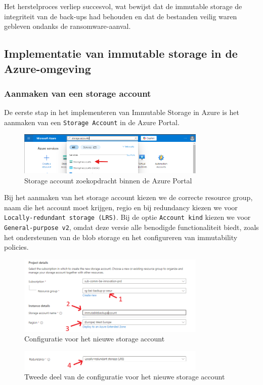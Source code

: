 Het herstelproces verliep succesvol, wat bewijst dat de immutable storage de integriteit van de back-ups had behouden en dat de bestanden veilig waren gebleven ondanks de ransomware-aanval.

\newpage
\subsection{Implementatie van immutable storage in de Azure-omgeving}
\subsubsection{Aanmaken van een storage account}
De eerste stap in het implementeren van Immutable Storage in Azure is het aanmaken van een \texttt{Storage Account} in de Azure Portal. 
\begin{figure}[h]
    \centering
    \captionsetup{justification=centering}    
    \includegraphics[width=0.8\textwidth]{img/1imm.png}
    \caption{Storage account zoekopdracht binnen de Azure Portal}
\end{figure}
Bij het aanmaken van het storage account kiezen we de correcte resource group, naam die het account moet krijgen, regio en bij redundancy kiezen we voor \texttt{Locally-redundant storage (LRS)}. Bij de optie \texttt{Account kind} kiezen we voor \texttt{General-purpose v2}, omdat deze versie alle benodigde functionaliteit biedt, zoals het ondersteunen van de blob storage en het configureren van immutability policies. 
\begin{figure}[h]
    \centering
    \captionsetup{justification=centering}    
    \includegraphics[width=0.8\textwidth]{img/3.1imm.png}
    \caption{Configuratie voor het nieuwe storage account}
\end{figure}
\begin{figure}[h]
    \centering
    \captionsetup{justification=centering}    
    \includegraphics[width=0.8\textwidth]{img/3.2imm.png}
    \caption{Tweede deel van de configuratie voor het nieuwe storage account}
\end{figure}
\newpage
